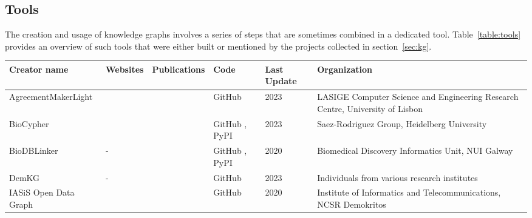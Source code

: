 \documentclass{article}
\begin{document}
\newpage
\begin{landscape}

\subsection{Tools}
\label{sec:tools}

The creation and usage of knowledge graphs involves a series of steps that are sometimes combined in a dedicated tool. Table~\ref{table:tools} provides an overview of such tools that were either built or mentioned by the projects collected in section~\ref{sec:kg}.


\begin{xltabular}{\textwidth}{p{5cm}|p{2.2cm}|p{2.2cm}|p{2.2cm}|p{1cm}|p{6cm}}
Creator name
&
Websites
&
Publications
&
Code
&
Last Update
&
Organization
\\


\hline
\hline


AgreementMakerLight
&
\cite{agreementmakerlight_website}
&
\cite{agreementmakerlight_publication}
&
GitHub
\cite{agreementmakerlight_github}
&
2023
&
LASIGE Computer Science and Engineering Research Centre,
University of Lisbon
\cite{agreementmakerlight_group}
\\


\hline


BioCypher
&
\cite{biocypher_website}
&
\cite{biocypher_publication}
&
GitHub
\cite{biocypher_github},
PyPI
\cite{biocypher_pypi}
&
2023
&
Saez-Rodriguez Group,
Heidelberg University
\cite{biocypher_group}
\\


\hline


BioDBLinker
&
-
&
\cite{biokg_publication}
&
GitHub
\cite{biokg_github2},
PyPI
\cite{biokg_pypi}
&
2020
&
Biomedical Discovery Informatics Unit, NUI Galway
\cite{biokg_group1}
\cite{biokg_group2}
\\


\hline


DemKG
&
-
&
\cite{demkg_publication}
&
GitHub
\cite{demkg_github}
&
2023
&
Individuals from various research institutes
\\


\hline


IASiS Open Data Graph
&
\cite{iasisodg_website}
&
\cite{iasisodg_publication}
&
GitHub
\cite{iasisodg_github}
&
2020
&
Institute of Informatics and Telecommunications, NCSR Demokritos
\cite{iasisodg_group}
\\


\hline



\end{xltabular}
\end{landscape}
\end{document}
